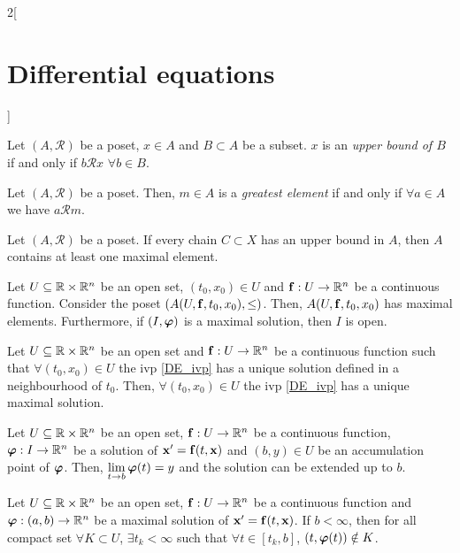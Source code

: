 \documentclass[../../../main.tex]{subfiles}
\begin{document}
\begin{multicols}{2}[\section{Differential equations}]
  \begin{definition}
    Let $(A,\mathcal{R})$ be a poset, $x\in A$ and $B\subset A$ be a subset. $x$ is an \textit{upper bound of $B$} if and only if $b\mathcal{R}x$ $\forall b\in B$.
  \end{definition}
  \begin{definition}
    Let $(A,\mathcal{R})$ be a poset. Then, $m\in A$ is a \textit{greatest element} if and only if $\forall a\in A$ we have $a \mathcal{R} m$.
  \end{definition}
  \begin{lemma}
    Let $(A,\mathcal{R})$ be a poset. If every chain $C\subset X$ has an upper bound in $A$, then $A$ contains at least one maximal element.
  \end{lemma}
  \begin{theorem}
    Let $U\subseteq\mathbb{R}\times\mathbb{R}^n$ be an open set, $(t_0,x_0)\in U$ and $\boldsymbol{\mathrm{f}}:U\rightarrow\mathbb{R}^n$ be a continuous function. Consider the poset $(A(U,\boldsymbol{\mathrm{f}},t_0,x_0),\leq)$. Then, $A(U,\boldsymbol{\mathrm{f}},t_0,x_0)$ has maximal elements. Furthermore, if $(I,\boldsymbol{\mathrm{\varphi}})$ is a maximal solution, then $I$ is open.
  \end{theorem}
  \begin{prop}
    Let $U\subseteq\mathbb{R}\times\mathbb{R}^n$ be an open set and $\boldsymbol{\mathrm{f}}:U\rightarrow\mathbb{R}^n$ be a continuous function such that $\forall(t_0,x_0)\in U$ the ivp \eqref{DE_ivp} has a unique solution defined in a neighbourhood of $t_0$. Then, $\forall(t_0,x_0)\in U$ the ivp \eqref{DE_ivp} has a unique maximal solution.
  \end{prop}
  \begin{lemma}
    Let $U\subseteq\mathbb{R}\times\mathbb{R}^n$ be an open set, $\boldsymbol{\mathrm{f}}:U\rightarrow\mathbb{R}^n$ be a continuous function, $\boldsymbol{\mathrm{\varphi}}:I\rightarrow\mathbb{R}^n$ be a solution of $\boldsymbol{\mathrm{x}}'=\boldsymbol{\mathrm{f}}(t,\boldsymbol{\mathrm{x}})$ and $(b,y)\in U$ be an accumulation point of $\boldsymbol{\mathrm{\varphi}}$. Then, $\displaystyle\lim_{t\to b}\boldsymbol{\mathrm{\varphi}}(t)=y$ and the solution can be extended up to $b$.
  \end{lemma}
  \begin{prop}
    Let $U\subseteq\mathbb{R}\times\mathbb{R}^n$ be an open set, $\boldsymbol{\mathrm{f}}:U\rightarrow\mathbb{R}^n$ be a continuous function and $\boldsymbol{\mathrm{\varphi}}:(a,b)\rightarrow\mathbb{R}^n$ be a maximal solution of $\boldsymbol{\mathrm{x}}'=\boldsymbol{\mathrm{f}}(t,\boldsymbol{\mathrm{x}})$. If $b<\infty$, then for all compact set $\forall K\subset U$, $\exists t_k<\infty$ such that $\forall t\in[t_k,b]$, $(t,\boldsymbol{\mathrm{\varphi}}(t))\notin K$.
  \end{prop}

\end{multicols}
\end{document}
